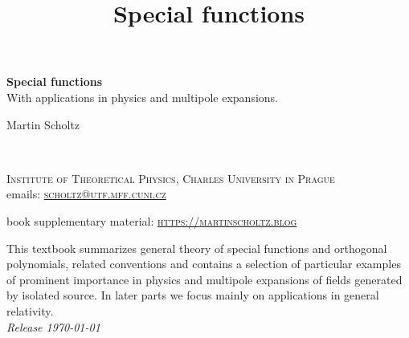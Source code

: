 \documentclass[11pt,fleqn,makeidx]{book} %
\begin{document}
\title{Special functions}


\begingroup
\thispagestyle{empty}
\centering
\vspace*{5cm}
\par\normalfont\fontsize{35}{35}\sffamily\selectfont
\textbf{Special functions}\\
{\LARGE With applications in physics and multipole expansions.}\par %
\vspace*{1cm}
{\Huge Martin Scholtz}\par %
\endgroup


\newpage
~\vfill
\thispagestyle{empty}


\noindent \textsc{Institute of Theoretical Physics, Charles University in Prague}\\

\noindent emails: \href{mailto:scholtz@utf.mff.cuni.cz}{\textsc{scholtz@utf.mff.cuni.cz}}\ %

\vspace{1cm}

\noindent book supplementary material: \href{http://martinscholtz.blog}{\textsc{https://martinscholtz.blog}}

\vspace{1cm}

\noindent This textbook summarizes general theory of special functions and orthogonal polynomials, related conventions and contains a selection of particular examples of prominent importance in physics and multipole expansions of fields generated by isolated source. In later parts we focus mainly on applications in general relativity.\\ %

\noindent \textit{Release \today} %
\end{document}
